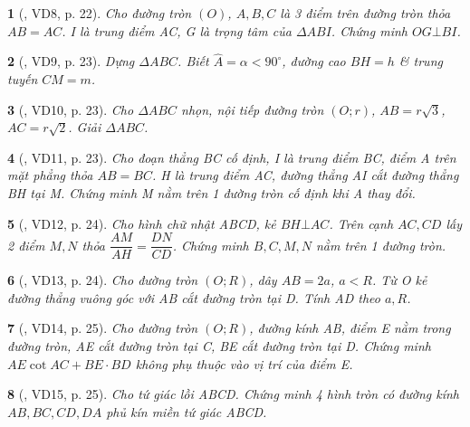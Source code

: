 \documentclass{article}
\newtheorem{baitoan}{}
\begin{document}
\begin{baitoan}[\cite{TLCT_THCS_Toan_9_hinh_hoc}, VD8, p. 22]
	Cho đường tròn $(O)$, $A,B,C$ là 3 điểm trên đường tròn thỏa $AB = AC$. I là trung điểm AC, G là trọng tâm của $\Delta ABI$. Chứng minh $OG\bot BI$.
\end{baitoan}

\begin{baitoan}[\cite{TLCT_THCS_Toan_9_hinh_hoc}, VD9, p. 23]
	Dựng $\Delta ABC$. Biết $\widehat{A} = \alpha < 90^\circ$, đường cao $BH = h$ \& trung tuyến $CM = m$.
\end{baitoan}

\begin{baitoan}[\cite{TLCT_THCS_Toan_9_hinh_hoc}, VD10, p. 23]
	Cho $\Delta ABC$ nhọn, nội tiếp đường tròn $(O;r)$, $AB = r\sqrt{3}$, $AC = r\sqrt{2}$. Giải $\Delta ABC$.
\end{baitoan}

\begin{baitoan}[\cite{TLCT_THCS_Toan_9_hinh_hoc}, VD11, p. 23]
	Cho đoạn thẳng BC cố định, I là trung điểm BC, điểm A trên mặt phẳng thỏa $AB = BC$. H là trung điểm AC, đường thẳng AI cắt đường thẳng BH tại M. Chứng minh M nằm trên 1 đường tròn cố định khi A thay đổi.
\end{baitoan}

\begin{baitoan}[\cite{TLCT_THCS_Toan_9_hinh_hoc}, VD12, p. 24]
	Cho hình chữ nhật ABCD, kẻ $BH\bot AC$. Trên cạnh $AC,CD$ lấy 2 điểm $M,N$ thỏa $\dfrac{AM}{AH} = \dfrac{DN}{CD}$. Chứng minh $B,C,M,N$ nằm trên 1 đường tròn.
\end{baitoan}

\begin{baitoan}[\cite{TLCT_THCS_Toan_9_hinh_hoc}, VD13, p. 24]
	Cho đường tròn $(O;R)$, dây $AB = 2a$, $a < R$. Từ O kẻ đường thẳng vuông góc với AB cắt đường tròn tại D. Tính AD theo $a,R$.
\end{baitoan}

\begin{baitoan}[\cite{TLCT_THCS_Toan_9_hinh_hoc}, VD14, p. 25]
	Cho đường tròn $(O;R)$, đường kính AB, điểm E nằm trong đường tròn, AE cắt đường tròn tại C, BE cắt đường tròn tại D. Chứng minh $AE\cot AC + BE\cdot BD$ không phụ thuộc vào vị trí của điểm E.
\end{baitoan}

\begin{baitoan}[\cite{TLCT_THCS_Toan_9_hinh_hoc}, VD15, p. 25]
	Cho tứ giác lồi ABCD. Chứng minh 4 hình tròn có đường kính $AB,BC,CD,DA$ phủ kín miền tứ giác ABCD.
\end{baitoan}
\end{document}
